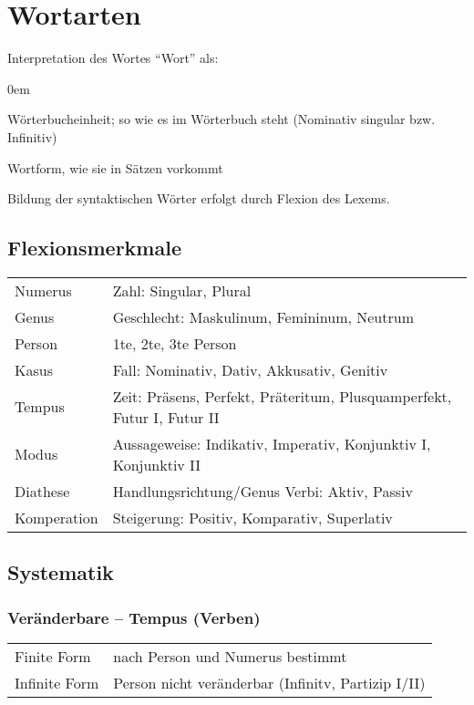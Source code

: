 \section{Wortarten}
Interpretation des Wortes \enquote{Wort} als:
\begin{description}\itemsep0em
	\item [Lexem] Wörterbucheinheit; so wie es im Wörterbuch steht (Nominativ singular bzw. Infinitiv)
	\item [syntaktische Einheit] Wortform, wie sie in Sätzen vorkommt
\end{description}
Bildung der syntaktischen Wörter erfolgt durch Flexion des Lexems.

\subsection{Flexionsmerkmale}
\settowidth{\MyLenA}{Komparation~~}
\begin{tabular}{@{}p{\the\MyLenA}%
				@{}p{\linewidth-\the\MyLenA}}
Numerus 	& Zahl: Singular, Plural\\
Genus 		& Geschlecht: Maskulinum, Femininum, Neutrum \\
Person 		& 1te, 2te, 3te Person\\
Kasus 		& Fall: Nominativ, Dativ, Akkusativ, Genitiv\\
Tempus 		& Zeit: Präsens, Perfekt, Präteritum, Plusquamperfekt, Futur I, Futur II\\
Modus 		& Aussageweise: Indikativ, Imperativ, Konjunktiv I, Konjunktiv II\\
Diathese 	& Handlungsrichtung/Genus Verbi: Aktiv, Passiv\\
Komperation	& Steigerung: Positiv, Komparativ, Superlativ\\
\end{tabular}

\subsection{Systematik}
\subsubsection{Veränderbare -- Tempus (Verben)}
\settowidth{\MyLenA}{Infinite Form~~}
\begin{tabular}{@{}p{\the\MyLenA}%
				@{}p{\linewidth-\the\MyLenA}}
Finite Form 	& nach Person und Numerus bestimmt\\
Infinite Form	& Person nicht veränderbar (Infinitv, Partizip I/II)\\
\end{tabular}

